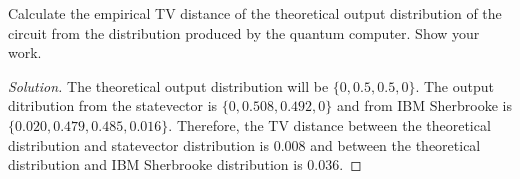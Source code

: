 \begin{solution}[label=ques:4c]
  \begin{question}
    Calculate the empirical TV distance of the theoretical output distribution of the circuit from the distribution produced by the quantum computer. Show your work.
  \end{question}
  \tcblower{}
  \begin{proof}[Solution]
    The theoretical output distribution will be $\{0, 0.5, 0.5, 0\}$. The output ditribution from the statevector is $\{0, 0.508, 0.492, 0\}$ and from IBM Sherbrooke is $\{0.020, 0.479, 0.485, 0.016\}$. Therefore, the TV distance between the theoretical distribution and statevector distribution is $0.008$ and between the theoretical distribution and IBM Sherbrooke distribution is $0.036$.
  \end{proof}
\end{solution}
